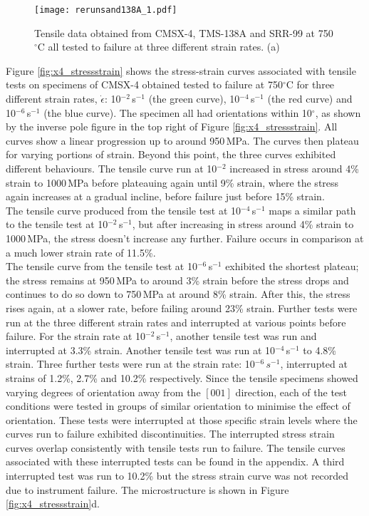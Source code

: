 \documentclass[a4paper,12pt,times,numbered,print,index]{Classes/PhDThesisPSnPDF}
\begin{document}
\begin{figure}
\texttt{[image: rerunsand138A\_1.pdf]}
\caption{Tensile data obtained from CMSX-4, TMS-138A and SRR-99 at 750\,$^\circ$C all tested to failure at three different strain rates. (a) }
\label{fig:138A_stressstrain}
\end{figure}

Figure \ref{fig:x4_stressstrain} shows the stress-strain curves associated with tensile tests on specimens of CMSX-4 obtained tested to failure at 750$^{\circ}$C for three different strain rates, $\dot{\epsilon}$: 10$^{-2}$\,s$^{-1}$ (the green curve), 10$^{-4}$\,s$^{-1}$ (the red curve) and 10$^{-6}$\,s$^{-1}$ (the blue curve). The specimen all had orientations within 10$^\circ$, as shown by the inverse pole figure in the top right of Figure \ref{fig:x4_stressstrain}. All curves show a linear progression up to around 950\,MPa. The curves then plateau for varying portions of strain. Beyond this point, the three curves exhibited different behaviours. The tensile curve run at 10$^{-2}$ increased in stress around 4\% strain to 1000\,MPa before plateauing again until 9\% strain, where the stress again increases at a gradual incline, before failure just before 15\% strain.\\
The tensile curve produced from the tensile test at 10$^{-4}$\,s$^{-1}$ maps a similar path to the tensile test at 10$^{-2}$\,s$^{-1}$, but after increasing in stress around 4\% strain to 1000\,MPa, the stress doesn't increase any further. Failure occurs in comparison at a much lower strain rate of 11.5\%.\\
The tensile curve from the tensile test at 10$^{-6}$\,s$^{-1}$ exhibited the shortest plateau; the stress remains at 950\,MPa to around 3\% strain before the stress drops and continues to do so down to 750\,MPa at around 8\% strain. After this, the stress rises again, at a slower rate, before failing around 23\% strain.
Further tests were run at the three different strain rates and interrupted at various points before failure. For the strain rate at 10$^{-2}$\,s$^{-1}$, another tensile test was run and interrupted at 3.3\% strain. Another tensile test was run at 10$^{-4}$\,s$^{-1}$ to 4.8\% strain. Three further tests were run at the  strain rate: 10$^{-6}\,s^{-1}$, interrupted at strains of  1.2\%, 2.7\% and 10.2\% respectively.
Since the tensile specimens showed varying degrees of orientation away from the $[001]$ direction, each of the test conditions were tested in groups of similar orientation to minimise the effect of orientation. These tests were interrupted at those specific strain levels where the curves run to failure exhibited discontinuities. The interrupted stress strain curves overlap consistently with tensile tests run to failure. The tensile curves associated with these interrupted tests can be found in the appendix. A third interrupted test was run to 10.2\% but the stress strain curve was not recorded due to instrument failure. The microstructure is shown in Figure \ref{fig:x4_stressstrain}d.\\
\end{document}
